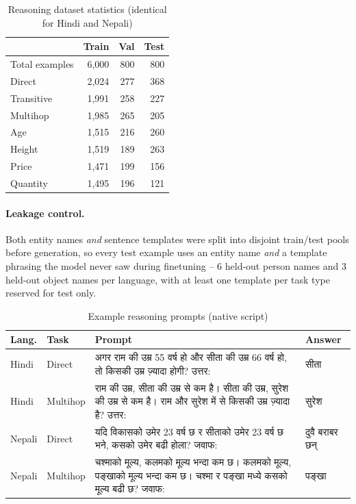 \documentclass[10pt,a4paper]{article}
\newcommand{\deva}[1]{{\devanagarifont #1}}
\begin{document}
\begin{table}[H]\centering
\caption{Reasoning dataset statistics (identical for Hindi and Nepali)}
\small
\begin{tabular}{lrrr}\toprule
& Train & Val & Test\\\midrule
Total examples & 6,000 & 800 & 800\\
\quad Direct & 2,024 & 277 & 368\\
\quad Transitive & 1,991 & 258 & 227\\
\quad Multihop & 1,985 & 265 & 205\\\midrule
\quad Age & 1,515 & 216 & 260\\
\quad Height & 1,519 & 189 & 263\\
\quad Price & 1,471 & 199 & 156\\
\quad Quantity & 1,495 & 196 & 121\\
\bottomrule\end{tabular}
\end{table}

\paragraph{Leakage control.} Both entity names \emph{and} sentence
templates were split into disjoint train/test pools before generation, so
every test example uses an entity name \emph{and} a template phrasing the
model never saw during finetuning -- 6 held-out person names and 3 held-out
object names per language, with at least one template per task type
reserved for test only.

\begin{table}[H]\centering
\caption{Example reasoning prompts (native script)}
\small
\begin{tabular}{p{1.3cm}p{1cm}p{7cm}p{1.8cm}}\toprule
Lang. & Task & Prompt & Answer\\\midrule
Hindi & Direct & \deva{अगर राम की उम्र 55 वर्ष हो और सीता की उम्र 66 वर्ष हो, तो किसकी उम्र ज़्यादा होगी? उत्तर}: & \deva{सीता}\\
Hindi & Multihop & \deva{राम की उम्र, सीता की उम्र से कम है। सीता की उम्र, सुरेश की उम्र से कम है। राम और सुरेश में से किसकी उम्र ज़्यादा है? उत्तर}: & \deva{सुरेश}\\
Nepali & Direct & \deva{यदि विकासको उमेर 23 वर्ष छ र सीताको उमेर 23 वर्ष छ भने, कसको उमेर बढी होला? जवाफ}: & \deva{दुवै बराबर छन्}\\
Nepali & Multihop & \deva{चश्माको मूल्य, कलमको मूल्य भन्दा कम छ। कलमको मूल्य, पङ्खाको मूल्य भन्दा कम छ। चश्मा र पङ्खा मध्ये कसको मूल्य बढी छ? जवाफ}: & \deva{पङ्खा}\\
\bottomrule\end{tabular}
\end{table}
\end{document}
